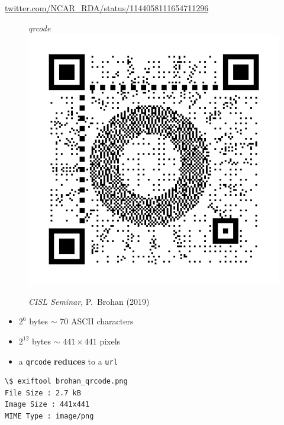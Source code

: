 \documentclass[a0paper]{betterposter}
\newenvironment{beamerblock}[1]{%
    \tcolorbox[beamer,%
    noparskip,breakable,
    colback=LightBlue,colframe=DarkBlue,%
    colbacklower=DarkBlue!75!LightBlue,%
    title=#1]}%
    {\endtcolorbox}
\begin{document}
{  \begin{beamerblock}{\textit{url}}
        \url{twitter.com/NCAR\_RDA/status/1144058111654711296}
  \end{beamerblock}

  \begin{minipage}[t]{0.43\linewidth}
      \begin{figure}
      \textit{qrcode}
          \includegraphics[width=\textwidth]{img/brohan_qrcode}
          \caption{
            \emph{CISL Seminar}, P.~Brohan (2019)
          }
      \end{figure}
  \end{minipage}
  \begin{minipage}[t]{0.55\linewidth}
      \ex
      \begin{itemize}
        \item $2^6$ bytes $\sim$ 70 ASCII characters
        \item $2^{12}$ bytes $\sim$ $441 \times 441$ pixels
        \item a \texttt{qrcode} \textbf{reduces} to a \texttt{url}
      \end{itemize}

\begin{verbatim}
\$ exiftool brohan_qrcode.png
File Size : 2.7 kB
Image Size : 441x441
MIME Type : image/png
\end{verbatim}
\end{minipage}

}
\end{document}
